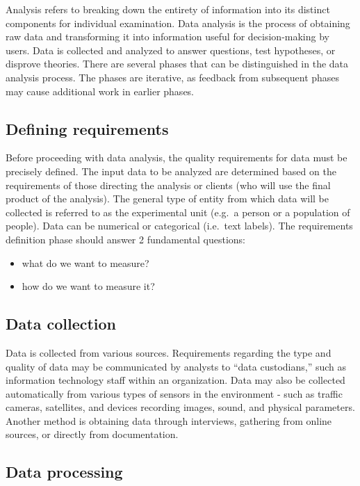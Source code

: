 \documentclass[
  english,
  letterpaper,
  DIV=11,
  numbers=noendperiod]{scrreprt}
\providecommand{\tightlist}{%
  \setlength{\itemsep}{0pt}\setlength{\parskip}{0pt}}
\begin{document}
Analysis refers to breaking down the entirety of information into its
distinct components for individual examination. Data analysis is the
process of obtaining raw data and transforming it into information
useful for decision-making by users. Data is collected and analyzed to
answer questions, test hypotheses, or disprove theories. There are
several phases that can be distinguished in the data analysis process.
The phases are iterative, as feedback from subsequent phases may cause
additional work in earlier phases.

\subsection{Defining requirements}\label{defining-requirements}

Before proceeding with data analysis, the quality requirements for data
must be precisely defined. The input data to be analyzed are determined
based on the requirements of those directing the analysis or clients
(who will use the final product of the analysis). The general type of
entity from which data will be collected is referred to as the
experimental unit (e.g.~a person or a population of people). Data can be
numerical or categorical (i.e.~text labels). The requirements definition
phase should answer 2 fundamental questions:

\begin{itemize}
\tightlist
\item
  what do we want to measure?
\item
  how do we want to measure it?
\end{itemize}

\subsection{Data collection}\label{data-collection}

Data is collected from various sources. Requirements regarding the type
and quality of data may be communicated by analysts to ``data
custodians,'' such as information technology staff within an
organization. Data may also be collected automatically from various
types of sensors in the environment - such as traffic cameras,
satellites, and devices recording images, sound, and physical
parameters. Another method is obtaining data through interviews,
gathering from online sources, or directly from documentation.

\subsection{Data processing}\label{data-processing}
\end{document}
